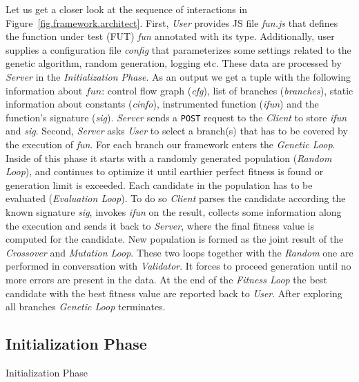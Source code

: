 \documentclass[sigconf]{acmart}
\newcommand{\Server}{\emph{Server}\xspace}
\newcommand{\Client}{\emph{Client}\xspace}
\newcommand{\User}{\emph{User}\xspace}
\newcommand{\Validator}{\emph{Validator}\xspace}
\begin{document}
Let us get a closer look at the sequence of interactions in Figure~\ref{fig.framework.architect}. First, \User provides JS file \emph{fun.js} that defines the function under test (FUT) \emph{fun} annotated with its type. Additionally, user supplies a configuration file \emph{config} that parameterizes some settings related to the genetic algorithm, random generation, logging etc. These data are processed by \Server in the \emph{Initialization Phase}. As an output we get a tuple with the following information about $fun$: control flow graph (\emph{cfg}), list of branches (\emph{branches}), static information about constants (\emph{cinfo}), instrumented function (\emph{ifun}) and the function's signature (\emph{sig}). \Server sends a \texttt{POST} request to the \Client to store \emph{ifun} and \emph{sig}. Second, \Server asks \User to select a branch(s) that has to be covered by the execution of \emph{fun}. For each branch our framework enters the \emph{Genetic Loop}. Inside of this phase it starts with a randomly generated population (\emph{Random Loop}), and continues to optimize it until earthier perfect fitness is found or generation limit is exceeded. Each candidate in the population has to be evaluated (\emph{Evaluation Loop}). To do so \Client parses the candidate according the known signature \emph{sig}, invokes \emph{ifun} on the result, collects some information along the execution and sends it back to \Server, where the final fitness value is computed for the candidate. New population is formed as the joint result of the \emph{Crossover} and \emph{Mutation Loop}. These two loops together with the \emph{Random} one are performed in conversation with \Validator. It forces to proceed generation until no more errors are present in the data. At the end of the \emph{Fitness Loop} the best candidate with the best fitness value are reported back to \User. After exploring all branches \emph{Genetic Loop} terminates. 

\subsection{Initialization Phase}
\label{sub.sec.init.phase}

\begin{algorithm}[t!]
  \caption{Initialization Phase}
  \label{alg.init}
  \scriptsize
  \DontPrintSemicolon
  \SetAlgoVlined
\end{algorithm}
\end{document}
